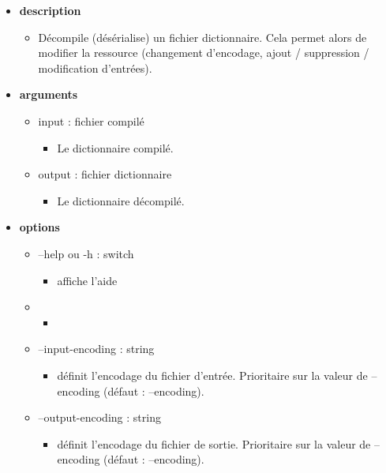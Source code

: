 \documentclass[manual-fr.tex]{subfiles}
\begin{document}
\begin{itemize}
    \item[] \textbf{description}
        \begin{itemize}
            \item[] Décompile (désérialise) un fichier dictionnaire. Cela permet alors de modifier la ressource (changement d'encodage, ajout / suppression / modification d'entrées).
        \end{itemize}
    \item[] \textbf{arguments}
        \begin{itemize}
            \item[] input : fichier compilé
                \begin{itemize}
                    \item[] Le dictionnaire compilé.
                \end{itemize}
            \item[] output : fichier dictionnaire
                \begin{itemize}
                    \item[] Le dictionnaire décompilé.
                \end{itemize}
        \end{itemize}
    \item[] \textbf{options}
        \begin{itemize}
            \item[] --help ou -h : switch
                \begin{itemize}
                    \item[] affiche l'aide
                \end{itemize}
            \item[] 
                \begin{itemize}
                    \item[] 
                \end{itemize}
            \item[] --input-encoding : string
                \begin{itemize}
                    \item[] définit l'encodage du fichier d'entrée. Prioritaire sur la valeur de --encoding (défaut : --encoding).
                \end{itemize}
            \item[] --output-encoding : string
                \begin{itemize}
                    \item[] définit l'encodage du fichier de sortie. Prioritaire sur la valeur de --encoding (défaut : --encoding).

\end{itemize}
\end{itemize}
\end{itemize}
\end{document}
